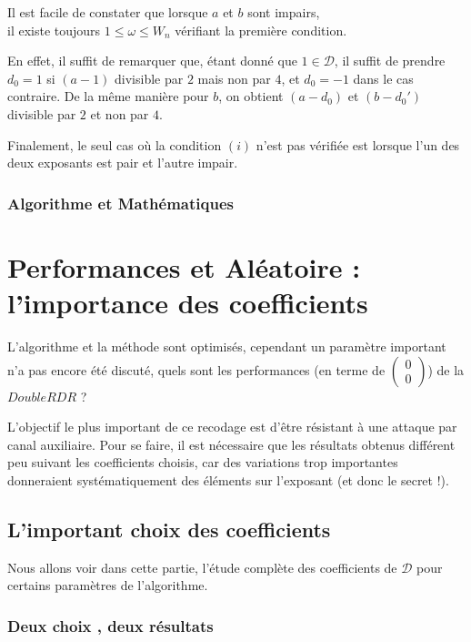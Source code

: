 \documentclass[12pt, a4paper]{memoir}
\newcommand{\doublezero}{\begin{pmatrix} 0 \\ 0 \end{pmatrix}}
\begin{document}
  \begin{Remarque}
   Il est facile de constater que lorsque $a$ et $b$ sont impairs, \\
   il existe toujours $1 \leq \omega \leq W_n$ vérifiant la première condition.
   
   En effet, il suffit de remarquer que, étant donné que $1 \in \mathcal{D}$, 
   il suffit de prendre $d_0 = 1$ si $(a-1)$ divisible par $2$ mais non par $4$, et $d_0 = -1$ dans
   le cas contraire. De la même manière pour $b$, on obtient $(a-d_0)$ et $(b-d_0')$ divisible par $2$ et 
   non par $4$.
   
   Finalement, le seul cas où la condition $(i)$ n'est pas vérifiée est lorsque l'un des deux exposants est pair
   et l'autre impair.
  \end{Remarque}

  \subsection{Algorithme et Mathématiques}
  
  
  
  \chapter{Performances et Aléatoire : l'importance des coefficients}
  
  L'algorithme et la méthode sont optimisés, cependant un paramètre important n'a pas encore été discuté,
  quels sont les performances (en terme de $\doublezero$) de la $DoubleRDR$ ?
  
  L'objectif le plus important de ce recodage est d'être résistant à une attaque par canal auxiliaire. Pour se 
  faire, il est nécessaire que les résultats obtenus différent peu suivant les coefficients choisis, car des variations 
  trop importantes donneraient systématiquement des éléments sur l'exposant (et donc le secret !).
  
  \section{L'important choix des coefficients}
  
  Nous allons voir dans cette partie, l'étude complète des coefficients de $\mathcal{D}$ pour certains paramètres
  de l'algorithme.
  
  \subsection{Deux choix , deux résultats}
  
\end{document}
